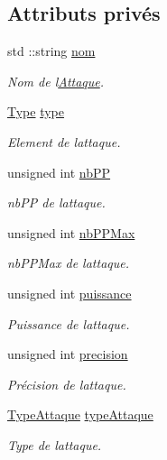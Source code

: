 \subsection*{Attributs privés}
\begin{DoxyCompactItemize}
\item 
std \+::string \hyperlink{class_attaque_a4adbe83e5fca0bd7533b32ff382dc682}{nom}
\begin{DoxyCompactList}\small\item\em Nom de l\textquotesingle{}\hyperlink{class_attaque}{Attaque}. \end{DoxyCompactList}\item 
\hyperlink{_attaque_8h_a1d1cfd8ffb84e947f82999c682b666a7}{Type} \hyperlink{class_attaque_a0a681a8a1fcefacefc6386c151cab12d}{type}
\begin{DoxyCompactList}\small\item\em Element de l\textquotesingle{}attaque. \end{DoxyCompactList}\item 
unsigned int \hyperlink{class_attaque_aa6b498ab7188fa4120473ea99b5dd1ab}{nb\+PP}
\begin{DoxyCompactList}\small\item\em nb\+PP de l\textquotesingle{}attaque. \end{DoxyCompactList}\item 
unsigned int \hyperlink{class_attaque_a3103b16987d3457eef9e503d5af8bee9}{nb\+P\+P\+Max}
\begin{DoxyCompactList}\small\item\em nb\+P\+P\+Max de l\textquotesingle{}attaque. \end{DoxyCompactList}\item 
unsigned int \hyperlink{class_attaque_acfa274f467927adfb0a99ecf009d9490}{puissance}
\begin{DoxyCompactList}\small\item\em Puissance de l\textquotesingle{}attaque. \end{DoxyCompactList}\item 
unsigned int \hyperlink{class_attaque_a221655b057b96a0cd5eb58309b99c8dd}{precision}
\begin{DoxyCompactList}\small\item\em Précision de l\textquotesingle{}attaque. \end{DoxyCompactList}\item 
\hyperlink{_attaque_8h_acefba67470a7a2e69ed731d28d318e64}{Type\+Attaque} \hyperlink{class_attaque_a8a430c66f761bd2786f2746f292c7425}{type\+Attaque}
\begin{DoxyCompactList}\small\item\em Type de l\textquotesingle{}attaque. \end{DoxyCompactList}\end{DoxyCompactItemize}


